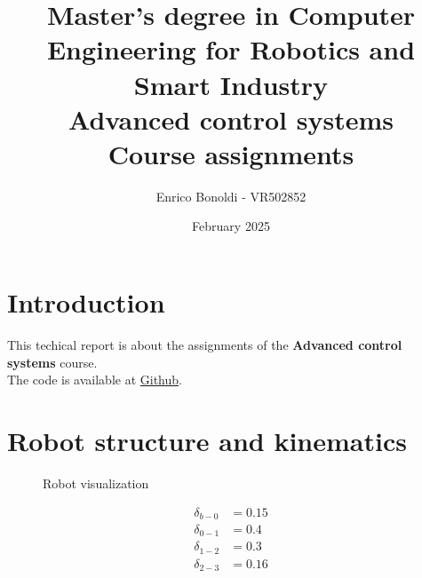 \documentclass{article}
\title{
    Master's degree in Computer Engineering for Robotics and Smart Industry \\
    \vspace{0.5cm}
    Advanced control systems \\
    \vspace{0.5cm}
    \large Course assignments
}
\author{Enrico Bonoldi - VR502852}
\date{February 2025}
\begin{document}
\maketitle
\newpage
\tableofcontents
\newpage


\section{Introduction}

This techical report is about the assignments of the \textbf{Advanced control systems} course.
\\
The code is available at \hyperlink{https://github.com/bonoldie/ACS}{Github}.

\section{Robot structure and kinematics}
\label{sec:kinematics}

\begin{figure}[!h]
    \centering
    \hfill
    \caption{Robot visualization}
    \label{fig:robot-visualization}
\end{figure}

\begin{align}
    \delta_{b-0} & = 0.15 \label{eq:delta_b_0} \\
    \delta_{0-1} & = 0.4 \label{eq:delta_0_1}  \\
    \delta_{1-2} & = 0.3 \label{eq:delta_1_2}  \\
    \delta_{2-3} & = 0.16 \label{eq:delta_2_3}
\end{align}
\end{document}
